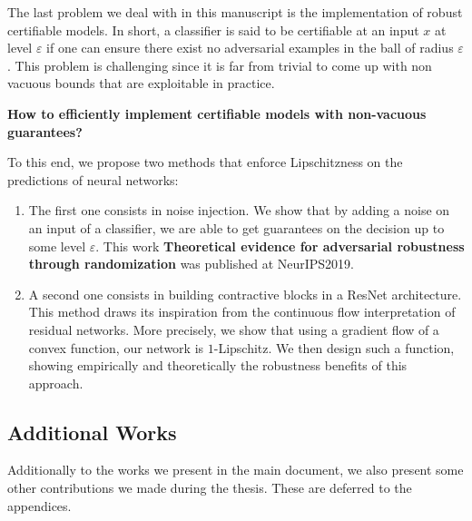 The last problem we deal with in this manuscript is the implementation of robust certifiable models. In short, a classifier is said to be certifiable at an input $x$ at level $\varepsilon$ if one can ensure there exist no adversarial examples in the ball of radius $\varepsilon$. This problem is challenging since it is far from trivial to come up with non vacuous bounds that are exploitable in practice.
\medskip
\begin{tcolorbox}[title=Question 3]
\textbf{How to efficiently implement certifiable models with non-vacuous guarantees?}
\end{tcolorbox}
\medskip
To this end, we propose two methods that enforce Lipschitzness on the predictions of neural networks:
\begin{enumerate}
    \item The first one consists in noise injection. We show that by adding a noise on an input of a classifier, we are able to get guarantees on the decision up to some level $\varepsilon$. This work \textbf{Theoretical evidence for adversarial robustness through randomization} was published at NeurIPS2019.
    \item A second one consists in building contractive blocks in a ResNet architecture. This method draws its inspiration from the continuous flow interpretation of residual networks. More precisely, we show that using a gradient flow of a convex function, our network is $1$-Lipschitz. We then design such a function, showing empirically and theoretically the robustness benefits of this approach. 

\end{enumerate}

\subsection{Additional Works}
Additionally to the works we present in the main document, we also present some other contributions we made during the thesis. These are deferred to the appendices. 

